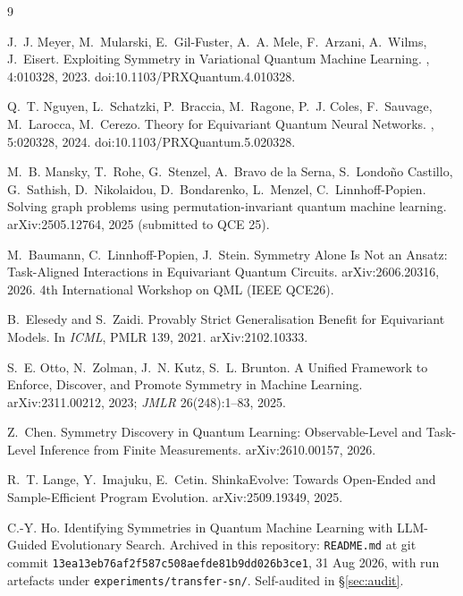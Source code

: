 \documentclass{neurips_2024}
\begin{document}
\begin{small}

\begin{thebibliography}{9}

 J.~J. Meyer, M.~Mularski, E.~Gil-Fuster, A.~A. Mele, F.~Arzani,
A.~Wilms, J.~Eisert.
\newblock Exploiting Symmetry in Variational Quantum Machine Learning.
, 4:010328, 2023. doi:10.1103/PRXQuantum.4.010328.

 Q.~T. Nguyen, L.~Schatzki, P.~Braccia, M.~Ragone, P.~J. Coles,
F.~Sauvage, M.~Larocca, M.~Cerezo.
\newblock Theory for Equivariant Quantum Neural Networks.
, 5:020328, 2024. doi:10.1103/PRXQuantum.5.020328.

 M.~B. Mansky, T.~Rohe, G.~Stenzel, A.~Bravo de la Serna,
S.~Londo\~no Castillo, G.~Sathish, D.~Nikolaidou, D.~Bondarenko, L.~Menzel,
C.~Linnhoff-Popien.
\newblock Solving graph problems using permutation-invariant quantum machine learning.
\newblock arXiv:2505.12764, 2025 (submitted to QCE 25).

 M.~Baumann, C.~Linnhoff-Popien, J.~Stein.
\newblock Symmetry Alone Is Not an Ansatz: Task-Aligned Interactions in Equivariant
Quantum Circuits.
\newblock arXiv:2606.20316, 2026. 4th International Workshop on QML (IEEE QCE26).

 B.~Elesedy and S.~Zaidi.
\newblock Provably Strict Generalisation Benefit for Equivariant Models.
\newblock In {\em ICML}, PMLR 139, 2021. arXiv:2102.10333.

 S.~E. Otto, N.~Zolman, J.~N. Kutz, S.~L. Brunton.
\newblock A Unified Framework to Enforce, Discover, and Promote Symmetry in Machine
Learning.
\newblock arXiv:2311.00212, 2023; {\em JMLR} 26(248):1--83, 2025.

 Z.~Chen.
\newblock Symmetry Discovery in Quantum Learning: Observable-Level and Task-Level
Inference from Finite Measurements.
\newblock arXiv:2610.00157, 2026.

 R.~T. Lange, Y.~Imajuku, E.~Cetin.
\newblock ShinkaEvolve: Towards Open-Ended and Sample-Efficient Program Evolution.
\newblock arXiv:2509.19349, 2025.

 C.-Y. Ho.
\newblock Identifying Symmetries in Quantum Machine Learning with LLM-Guided Evolutionary
Search.
\newblock Archived in this repository: \texttt{README.md} at git commit
\texttt{13ea13eb76af2f587c508aefde81b9dd026b3ce1}, 31 Aug 2026, with run artefacts under
\texttt{experiments/transfer-sn/}. Self-audited in \S\ref{sec:audit}.

\end{thebibliography}
\end{small}
\end{document}
